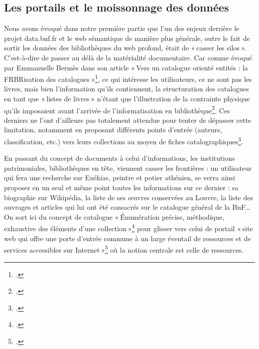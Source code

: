\subsection{Les portails et le moissonnage des données}



Nous avons évoqué dans notre première partie que l’un des enjeux derrière le projet data.bnf.fr et le web sémantique de manière plus générale, outre le fait de sortir les données des bibliothèques du web profond, était de « casser les silos ». C’est-à-dire de passer au délà de la matérialité documentaire. Car comme évoqué par Emmanuelle Bermès dans son article « Vers un catalogue orienté entités : la FRBRisation des catalogues »\footcite{bermes_vers_2016}, ce qui intéresse les utilisateurs, ce ne sont pas les livres, mais bien l’information qu’ils contiennent, la structuration des catalogues en tant que « listes de livres » n’étant que l’illustration de la contrainte physique qu’ils imposaient avant l’arrivée de l’informatisation en bibliothèque\footcite[§ 2]{bermes_vers_2016}. Ces derniers ne l’ont d’ailleurs pas totalement attendue pour tenter de dépasser cette limitation, notamment en proposant différents points d’entrée (auteurs, classification, etc.) vers leurs collections au moyen de fiches catalographiques\footcite[§ 5]{bermes_vers_2016}.

En passant du concept de documents à celui d’informations, les institutions patrimoniales, bibliothèques en tête, viennent casser les frontières : un utilisateur qui fera une recherche sur Exékias, peintre et potier athénien, se verra ainsi proposer en un seul et même point toutes les informations sur ce dernier : sa biographie sur Wikipédia, la liste de ses œuvres conservées au Louvre, la liste des ouvrages et articles qui lui ont été consacrés sur le catalogue général de la BnF… On sort ici du concept de catalogue « Énumération précise, méthodique, exhaustive des éléments d’une collection »\footcite{zotero-197} pour glisser vers celui de portail « site web qui offre une porte d’entrée commune à un large éventail de ressources et de services accessibles sur Internet »\footcite{2024} où la notion centrale est celle de ressources.

